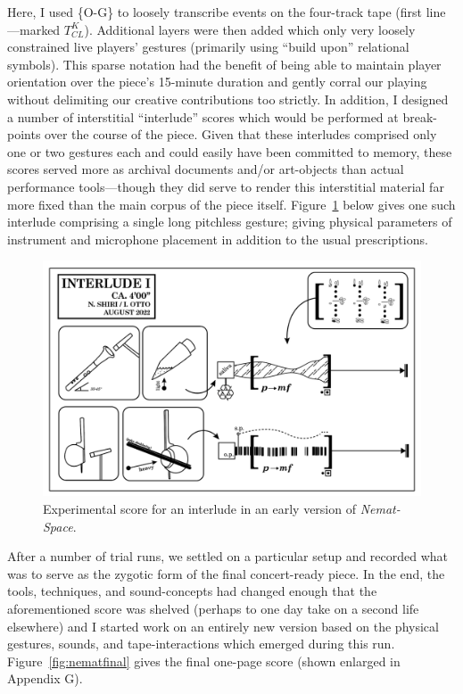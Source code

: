     \noindent Here, I used \{O-G\} to loosely transcribe events on the four-track tape (first line---marked $T^{K}_{CL}$). Additional layers were then added which only very loosely constrained live players' gestures (primarily using ``build upon'' relational symbols). This sparse notation had the benefit of being able to maintain player orientation over the piece's 15-minute duration and gently corral our playing without delimiting our creative contributions too strictly. In addition, I designed a number of interstitial ``interlude'' scores which would be performed at break-points over the course of the piece. Given that these interludes comprised only one or two gestures each and could easily have been committed to memory, these scores served more as archival documents and/or art-objects than actual performance tools---though they did serve to render this interstitial material far more fixed than the main corpus of the piece itself. Figure~\ref{fig:experimentalinterlude} below gives one such interlude comprising a single long pitchless gesture; giving physical parameters of instrument and microphone placement in addition to the usual prescriptions.
    
        \begin{figure}
            \centering
            \includegraphics[width=.8\textwidth]{images/chapter4/nemat-interlude.png}
            \captionsetup{width=.5\textwidth}
            \caption{Experimental score for an interlude in an early version of \textit{Nemat-Space}.}
            \label{fig:experimentalinterlude}
        \end{figure}

    After a number of trial runs, we settled on a particular setup and recorded what was to serve as the zygotic form of the final concert-ready piece. In the end, the tools, techniques, and sound-concepts had changed enough that the aforementioned score was shelved (perhaps to one day take on a second life elsewhere) and I started work on an entirely new version based on the physical gestures, sounds, and tape-interactions which emerged during this run. Figure~\ref{fig:nematfinal} gives the final one-page score (shown enlarged in Appendix G).
    
